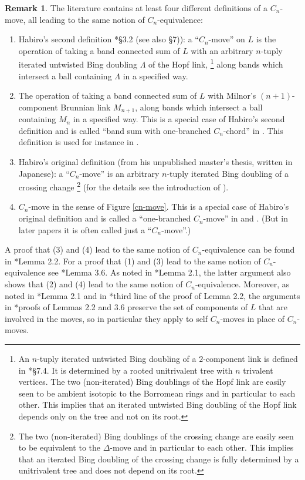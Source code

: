 \documentclass[a4paper,12pt,reqno,oneside]{amsart} %
\theoremstyle{plain}
\theoremstyle{definition}
\newtheorem{remark}[theorem]{Remark}
\theoremstyle{named}
\renewcommand{\:}{\colon}
\begin{document}
\begin{remark} \label{cn-definition}
The literature contains at least four different definitions of a $C_n$-move, all leading to the same notion of $C_n$-equivalence:
\begin{enumerate}
\item Habiro's second definition \cite{Hab}*{\S3.2 (see also \S7)}): a ``$C_n$-move'' on $L$ is the operation of taking a band 
connected sum of $L$ with an arbitrary $n$-tuply iterated untwisted Bing doubling $\Lambda$ of the Hopf link,%
\footnote{An $n$-tuply iterated untwisted Bing doubling of a $2$-component link is defined in \cite{Co3}*{\S7.4}.
It is determined by a rooted unitrivalent tree with $n$ trivalent vertices.
The two (non-iterated) Bing doublings of the Hopf link are easily seen to be ambient isotopic to the Borromean rings and
in particular to each other.
This implies that an iterated untwisted Bing doubling of the Hopf link depends only on the tree and not on its root.}
along bands which intersect a ball containing $\Lambda$ in a specified way.
\item The operation of taking a band connected sum of $L$ with Milnor's $(n+1)$-component Brunnian link $M_{n+1}$, along bands which 
intersect a ball containing $M_n$ in a specified way.
This is a special case of Habiro's second definition and is called ``band sum with one-branched $C_n$-chord'' in \cite{MiY}.
This definition is used for instance in \cite{CDM}.
\item Habiro's original definition (from his unpublished master's thesis, written in Japanese): a ``$C_n$-move'' is an arbitrary 
$n$-tuply iterated Bing doubling of a crossing change%
\footnote{The two (non-iterated) Bing doublings of the crossing change are easily seen to be equivalent to the $\Delta$-move and
in particular to each other.
This implies that an iterated Bing doubling of the crossing change is fully determined by a unitrivalent tree and does not
depend on its root.}
(for the details see the introduction of \cite{MiY}).
\item $C_n$-move in the sense of Figure \ref{cn-move}.
This is a special case of Habiro's original definition and is called a ``one-branched $C_n$-move'' in \cite{MiY} and \cite{TaY}.
(But in later papers it is often called just a ``$C_n$-move''.)
\end{enumerate}
A proof that (3) and (4) lead to the same notion of $C_n$-equivalence can be found in \cite{TaY}*{Lemma 2.2}.
For a proof that (1) and (3) lead to the same notion of $C_n$-equivalence see \cite{TaY}*{Lemma 3.6}.
As noted in \cite{MiY}*{Lemma 2.1}, the latter argument also shows that (2) and (4) lead to the same 
notion of $C_n$-equivalence.
Moreover, as noted in \cite{MiY}*{Lemma 2.1} and in \cite{TaY}*{third line of the proof of Lemma 2.2},
the arguments in \cite{TaY}*{proofs of Lemmas 2.2 and 3.6} preserve the set of components of $L$ that are involved 
in the moves, so in particular they apply to self $C_n$-moves in place of $C_n$-moves.


\end{remark}
\end{document}
